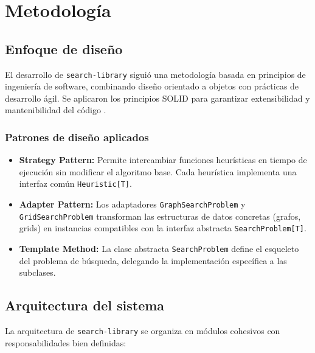 \section{Metodología}

\subsection{Enfoque de diseño}

El desarrollo de \texttt{search-library} siguió una metodología basada en principios de ingeniería de software, combinando diseño orientado a objetos con prácticas de desarrollo ágil. Se aplicaron los principios SOLID para garantizar extensibilidad y mantenibilidad del código \cite{martin2017clean}.

\subsubsection{Patrones de diseño aplicados}

\begin{itemize}
    \item \textbf{Strategy Pattern:} Permite intercambiar funciones heurísticas en tiempo de ejecución sin modificar el algoritmo base. Cada heurística implementa una interfaz común \texttt{Heuristic[T]}.
    
    \item \textbf{Adapter Pattern:} Los adaptadores \texttt{GraphSearchProblem} y \texttt{GridSearchProblem} transforman las estructuras de datos concretas (grafos, grids) en instancias compatibles con la interfaz abstracta \texttt{SearchProblem[T]}.
    
    \item \textbf{Template Method:} La clase abstracta \texttt{SearchProblem} define el esqueleto del problema de búsqueda, delegando la implementación específica a las subclases.
\end{itemize}

\subsection{Arquitectura del sistema}

La arquitectura de \texttt{search-library} se organiza en módulos cohesivos con responsabilidades bien definidas:

